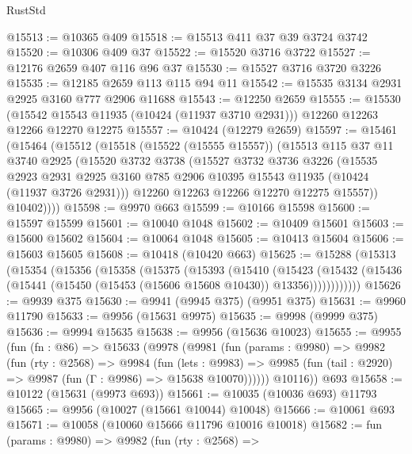 \begin{lexlean}{RustStd}
\begin{coremodule}
@15513 := @10365 @409
@15518 := @15513 @411 @37 @39 @3724 @3742
@15520 := @10306 @409 @37
@15522 := @15520 @3716 @3722
@15527 := @12176 @2659 @407 @116 @96 @37
@15530 := @15527 @3716 @3720 @3226
@15535 := @12185 @2659 @113 @115 @94 @11
@15542 := @15535 @3134 @2931 @2925 @3160 @777 @2906 @11688
@15543 := @12250 @2659
@15555 := @15530
    (@15542 @15543 @11935 (@10424 (@11937 @3710 @2931)))
    @12260
    @12263
    @12266
    @12270
    @12275
@15557 := @10424 (@12279 @2659)
@15597 := @15461
    (@15464
      (@15512
        (@15518
          (@15522 (@15555 @15557))
          (@15513
            @115
            @37
            @11
            @3740
            @2925
            (@15520
              @3732
              @3738
              (@15527
                @3732
                @3736
                @3226
                (@15535
                  @2923
                  @2931
                  @2925
                  @3160
                  @785
                  @2906
                  @10395
                  @15543
                  @11935
                  (@10424 (@11937 @3726 @2931)))
                @12260
                @12263
                @12266
                @12270
                @12275
                @15557))
            @10402))))
@15598 := @9970 @663
@15599 := @10166 @15598
@15600 := @15597 @15599
@15601 := @10040 @1048
@15602 := @10409 @15601
@15603 := @15600 @15602
@15604 := @10064 @1048
@15605 := @10413 @15604
@15606 := @15603 @15605
@15608 := @10418 (@10420 @663)
@15625 := @15288
    (@15313
      (@15354
        (@15356
          (@15358
            (@15375
              (@15393
                (@15410
                  (@15423
                    (@15432
                      (@15436 (@15441 (@15450 (@15453 (@15606 @15608 @10430)) @13356))))))))))))
@15626 := @9939 @375
@15630 := @9941 (@9945 @375) (@9951 @375)
@15631 := @9960 @11790
@15633 := @9956 (@15631 @9975)
@15635 := @9998 (@9999 @375)
@15636 := @9994 @15635
@15638 := @9956 (@15636 @10023)
@15655 := @9955
    (fun (fn : @86) =>
    @15633
      (@9978
        (@9981
          (fun (params : @9980) =>
          @9982
            (fun (rty : @2568) =>
            @9984
              (fun (lets : @9983) =>
              @9985 (fun (tail : @2920) => @9987 (fun (Γ : @9986) => @15638 @10070))))))
        @10116))
    @693
@15658 := @10122 (@15631 (@9973 @693))
@15661 := @10035 (@10036 @693) @11793
@15665 := @9956 (@10027 (@15661 @10044) @10048)
@15666 := @10061 @693
@15671 := @10058 (@10060 @15666 @11796 @10016 @10018)
@15682 := fun (params : @9980) =>
  @9982
    (fun (rty : @2568) =>

\end{coremodule}
\end{lexlean}
